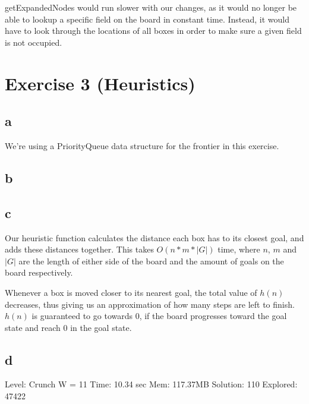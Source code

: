 \documentclass[12pt]{article}
\begin{document}
getExpandedNodes would run slower with our changes, as it would no longer be able to lookup a specific field on the board in constant time. Instead, it would have to look through the locations of all boxes in order to make sure a given field is not occupied.


\section{Exercise 3 (Heuristics)}
\label{sec:Exercise 3 (Heuristics)}

\subsection{a}
\label{sub:a}

We're using a PriorityQueue data structure for the frontier in this exercise.

\subsection{b}
\label{sub:b}


\subsection{c}
\label{sub:c}

Our heuristic function calculates the distance each box has to its closest goal, and adds these distances together. This takes $O(n*m*|G|)$ time, where $n$, $m$ and $|G|$ are the length of either side of the board and the amount of goals on the board respectively.

Whenever a box is moved closer to its nearest goal, the total value of $h(n)$ decreases, thus giving us an approximation of how many steps are left to finish. $h(n)$ is guaranteed to go towards 0, if the board progresses toward the goal state and reach 0 in the goal state.

\subsection{d}
\label{sub:d}

Level: Crunch
W = 11
Time: 10.34 sec
Mem: 117.37MB
Solution: 110
Explored: 47422
\end{document}
